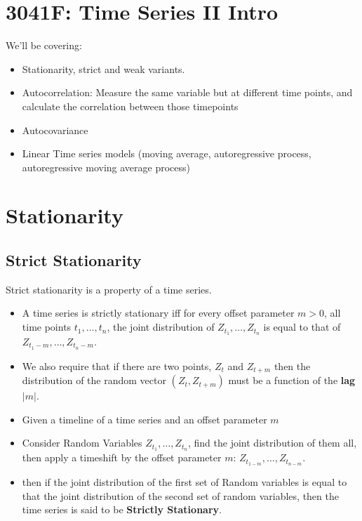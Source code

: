 \section{3041F: Time Series II Intro}
We'll be covering:
\begin{itemize}
    \item Stationarity, strict and weak variants.
    \item Autocorrelation: Measure the same variable but at different time points, and calculate the correlation between those timepoints
    \item Autocovariance
    \item Linear Time series models (moving average, autoregressive process, autoregressive moving average process)
\end{itemize}  

\section{Stationarity}
\subsection{Strict Stationarity}
Strict stationarity is a property of a time series.
\begin{itemize}
    \item A time series is strictly stationary iff for every offset parameter
        $m > 0$, all time points $t_1, \dots, t_n$, the joint distribution of
        $Z_{t_1}, \dots, Z_{t_n}$ is equal to that of $Z_{t_1 - m},
        \dots, Z_{t_n-m}$.
    \item We also require that if there are two points, $Z_t$ and  $Z_{t+m}$
        then  the distribution of the random vector  $\left( Z_t,
        Z_{t+m}\right)$ must be a function of the \textbf{lag} $|m|$.
    \item Given a timeline of a time series and an offset parameter $m$ 
    \item Consider Random Variables $Z_{t_1}, \dots, Z_{t_n}$, find the joint
        distribution of them all, then apply a timeshift by the offset
        parameter $m$: $Z_{t_{1-m}}, \dots, Z_{t_{n-m}}$.
    \item then if the joint distribution of the first set of Random variables
        is equal to that the joint distribution of the second set of random
        variables, then the time series is said to be \textbf{Strictly
        Stationary}.
\end{itemize}

